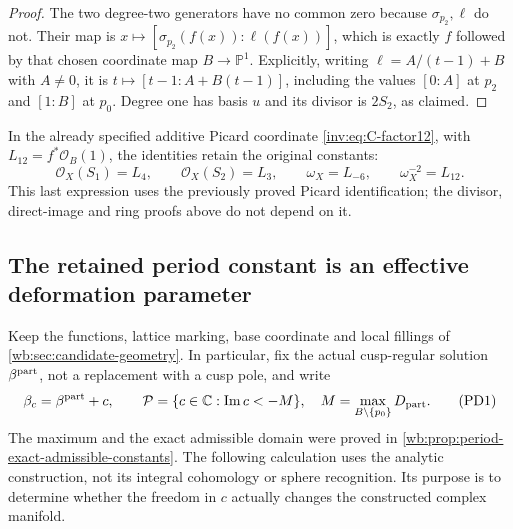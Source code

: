 \begin{proof}
The two degree-two generators have no common zero because
$\sigma_{p_2},\ell$ do not. Their map is
$x\mapsto[\sigma_{p_2}(f(x)):\ell(f(x))]$, which is exactly
$f$ followed by that chosen coordinate map $B\to\mathbb P^1$.
Explicitly, writing $\ell=A/(t-1)+B$ with $A\ne0$, it is
$t\mapsto[t-1:A+B(t-1)]$, including the values $[0:A]$ at $p_2$
and $[1:B]$ at $p_0$.
Degree one has basis $u$ and its divisor is $2S_2$, as claimed.
\end{proof}

In the already specified additive Picard coordinate \eqref{inv:eq:C-factor12}, with
$L_{12}=f^*\mathcal O_B(1)$, the identities retain the original constants:
\[
 \mathcal O_X(S_1)=L_4,\qquad
 \mathcal O_X(S_2)=L_3,\qquad
 \omega_X=L_{-6},\qquad \omega_X^{-2}=L_{12}.
\]
This last expression uses the previously proved Picard identification;
the divisor, direct-image and ring proofs above do not depend on it.


\subsection{The retained period constant is an effective deformation parameter}
\label{wb:sec:retained-period-deformation}

Keep the functions, lattice marking, base coordinate and local fillings of
\cref{wb:sec:candidate-geometry}. In particular, fix the actual cusp-regular
solution $\beta^{\rm part}$, not a replacement with a cusp pole, and write
\[
 \beta_c=\beta^{\rm part}+c,\qquad
 \mathcal P=\{c\in\mathbb C:\operatorname{Im}c<-M\},
 \quad M=\max_{B\setminus\{p_0\}}D_{\rm part}.
 \tag{PD1}
\]
The maximum and the exact admissible domain were proved in
\cref{wb:prop:period-exact-admissible-constants}. The following calculation
uses the analytic construction, not its integral cohomology or sphere
recognition. Its purpose is to determine whether the freedom in $c$
actually changes the constructed complex manifold.

